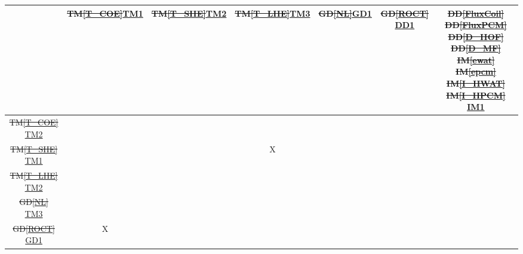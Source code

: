 \documentclass[12pt]{article}
\makeatletter
\newcommand{\dref}[1]{GD\ref{#1}}
\newcommand{\ddref}[1]{DD\ref{#1}}
\newcommand{\tref}[1]{TM\ref{#1}}
\newcommand{\iref}[1]{IM\ref{#1}}
\providecommand{\DIFdeltex}[1]{{\protect\color{red}\sout{#1}}} %
\providecommand{\DIFdelend}{} %
\providecommand{\DIFdelFL}[1]{\DIFdel{#1}} %
\providecommand{\DIFaddbeginFL}{} %
\providecommand{\DIFaddendFL}{} %
\providecommand{\DIFdelbeginFL}{} %
\providecommand{\DIFdelendFL}{} %
\providecommand{\DIFdel}[1]{\texorpdfstring{\DIFdeltex{#1}}{}} %
\newcommand{\DIFscaledelfig}{0.5}
\newlength{\DIFdelgraphicswidth} %
\newlength{\DIFdelgraphicsheight} %
\newcommand{\DIFaddincludegraphics}[2][]{{\color{blue}\fbox{\DIFOincludegraphics[#1]{#2}}}} %
\newcommand{\DIFdelincludegraphics}[2][]{%
\sbox{\DIFdelgraphicsbox}{\DIFOincludegraphics[#1]{#2}}%
\settoboxwidth{\DIFdelgraphicswidth}{\DIFdelgraphicsbox} %
\settoboxtotalheight{\DIFdelgraphicsheight}{\DIFdelgraphicsbox} %
\scalebox{\DIFscaledelfig}{%
\parbox[b]{\DIFdelgraphicswidth}{\usebox{\DIFdelgraphicsbox}\\[-\baselineskip] \rule{\DIFdelgraphicswidth}{0em}}\llap{\resizebox{\DIFdelgraphicswidth}{\DIFdelgraphicsheight}{%
\setlength{\unitlength}{\DIFdelgraphicswidth}%
\begin{picture}(1,1)%
\thicklines\linethickness{2pt} %
{\color[rgb]{1,0,0}\put(0,0){\framebox(1,1){}}}%
{\color[rgb]{1,0,0}\put(0,0){\line( 1,1){1}}}%
{\color[rgb]{1,0,0}\put(0,1){\line(1,-1){1}}}%
\end{picture}%
}\hspace*{3pt}}} %
} %
\DeclareRobustCommand{\DIFdelend}{\DIFOaddend \let\includegraphics\DIFOincludegraphics} %
\DeclareRobustCommand{\DIFaddbeginFL}{\DIFOaddbeginFL \let\includegraphics\DIFaddincludegraphics} %
\DeclareRobustCommand{\DIFaddendFL}{\DIFOaddendFL \let\includegraphics\DIFOincludegraphics} %
\DeclareRobustCommand{\DIFdelbeginFL}{\DIFOdelbeginFL \let\includegraphics\DIFdelincludegraphics} %
\DeclareRobustCommand{\DIFdelendFL}{\DIFOaddendFL \let\includegraphics\DIFOincludegraphics} %
\let\sout@orig\sout %
\renewcommand{\sout}[1]{\ifmmode\text{\sout@orig{\ensuremath{#1}}}\else\sout@orig{#1}\fi} %
\makeatother
\begin{document}

\DIFdelend \begin{table}[h!]
  \centering
  \DIFdelbeginFL %
\DIFdelendFL \DIFaddbeginFL \begin{tabular}{|c|c|c|c|c|c|c|}
  \DIFaddendFL \hline        
  & \DIFdelbeginFL \DIFdelFL{\tref{T_COE}}\DIFdelendFL \DIFaddbeginFL \hyperref[TM:FWDKinematics]{TM1}
  \DIFaddendFL & \DIFdelbeginFL \DIFdelFL{\tref{T_SHE}}\DIFdelendFL \DIFaddbeginFL \hyperref[TM:SegmentCircleCollision]{TM2}
  \DIFaddendFL & \DIFdelbeginFL \DIFdelFL{\tref{T_LHE}}\DIFdelendFL \DIFaddbeginFL \hyperref[TM:AStarJointSpace]{TM3}
  \DIFaddendFL & \DIFdelbeginFL \DIFdelFL{\dref{NL}}\DIFdelendFL \DIFaddbeginFL \hyperref[GD_AStar_DiscreteJointSpace]{GD1}
  \DIFaddendFL & \DIFdelbeginFL \DIFdelFL{\dref{ROCT} }\DIFdelendFL \DIFaddbeginFL \hyperref[DD_EndEffectorPosition]{DD1}
  \DIFaddendFL & \DIFdelbeginFL \DIFdelFL{\ddref{FluxCoil}}%
\DIFdelFL{\ddref{FluxPCM} }%
\DIFdelFL{\ddref{D_HOF}}%
\DIFdelFL{\ddref{D_MF}}%
\DIFdelFL{\iref{ewat}}%
\DIFdelFL{\iref{epcm}}%
\DIFdelFL{\iref{I_HWAT}}%
\DIFdelFL{\iref{I_HPCM} }\DIFdelendFL \DIFaddbeginFL \hyperref[IM:ArmPathPlanning]{IM1} \DIFaddendFL \\
  \hline
  \DIFdelbeginFL \DIFdelFL{\tref{T_COE}     }\DIFdelendFL \DIFaddbeginFL \hyperref[TM:SegmentCircleCollision]{TM2} \DIFaddendFL & & & & & & \DIFdelbeginFL %
\DIFdelendFL \\ \hline
  \DIFdelbeginFL \DIFdelFL{\tref{T_SHE}     }\DIFdelendFL \DIFaddbeginFL \hyperref[TM:FWDKinematics]{TM1}         \DIFaddendFL & & & X & & & \DIFdelbeginFL %
\DIFdelendFL \\ \hline
  \DIFdelbeginFL \DIFdelFL{\tref{T_LHE}     }\DIFdelendFL \DIFaddbeginFL \hyperref[TM:SegmentCircleCollision]{TM2} \DIFaddendFL & & & & & & \DIFdelbeginFL %
\DIFdelendFL \\ \hline
  \DIFdelbeginFL \DIFdelFL{\dref{NL}        }\DIFdelendFL \DIFaddbeginFL \hyperref[TM:AStarJointSpace]{TM3}       \DIFaddendFL & & & & & & \DIFdelbeginFL %
\DIFdelendFL \\ \hline
  \DIFdelbeginFL \DIFdelFL{\dref{ROCT}      }\DIFdelendFL \DIFaddbeginFL \hyperref[GD_AStar_DiscreteJointSpace]{GD1} \DIFaddendFL & X & & & & & \DIFdelbeginFL %

\end{tabular}
\end{table}
\end{document}
